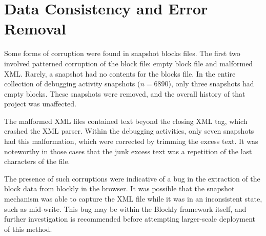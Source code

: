 \section{Data Consistency and Error Removal}
Some forms of corruption were found in snapshot blocks files. The first two involved patterned corruption of the block file: empty block file and malformed XML. Rarely, a snapshot had no contents for the blocks file. In the entire collection of debugging activity snapshots ($n = 6890$), only three snapshots had empty blocks. These snapshots were removed, and the overall history of that project was unaffected. 

The malformed XML files contained text beyond the closing XML tag, which crashed the XML parser. Within the debugging activities, only seven snapshots had this malformation, which were corrected by trimming the excess text. It was noteworthy in those cases that the junk excess text was a repetition of the last characters of the file.%

The presence of such corruptions were indicative of a bug in the extraction of the block data from blockly in the browser. It was possible that the snapshot mechanism was able to capture the XML file while it was in an inconsistent state, such as mid-write. This bug may be within the Blockly framework itself, and further investigation is recommended before attempting larger-scale deployment of this method.


